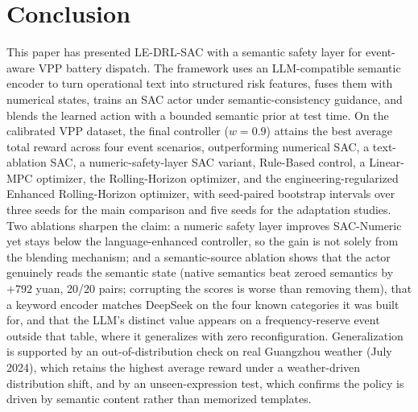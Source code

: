 \documentclass{ieeeaccess}
\begin{document}
\section{Conclusion}
\label{sec:conclusion}
This paper has presented LE-DRL-SAC with a semantic safety layer for event-aware VPP battery dispatch. The framework uses an LLM-compatible semantic encoder to turn operational text into structured risk features, fuses them with numerical states, trains an SAC actor under semantic-consistency guidance, and blends the learned action with a bounded semantic prior at test time. On the calibrated VPP dataset, the final controller ($w=0.9$) attains the best average total reward across four event scenarios, outperforming numerical SAC, a text-ablation SAC, a numeric-safety-layer SAC variant, Rule-Based control, a Linear-MPC optimizer, the Rolling-Horizon optimizer, and the engineering-regularized Enhanced Rolling-Horizon optimizer, with seed-paired bootstrap intervals over three seeds for the main comparison and five seeds for the adaptation studies. Two ablations sharpen the claim: a numeric safety layer improves SAC-Numeric yet stays below the language-enhanced controller, so the gain is not solely from the blending mechanism; and a semantic-source ablation shows that the actor genuinely reads the semantic state (native semantics beat zeroed semantics by $+792$ yuan, 20/20 pairs; corrupting the scores is worse than removing them), that a keyword encoder matches DeepSeek on the four known categories it was built for, and that the LLM's distinct value appears on a frequency-reserve event outside that table, where it generalizes with zero reconfiguration. Generalization is supported by an out-of-distribution check on real Guangzhou weather (July 2024), which retains the highest average reward under a weather-driven distribution shift, and by an unseen-expression test, which confirms the policy is driven by semantic content rather than memorized templates.
\end{document}
